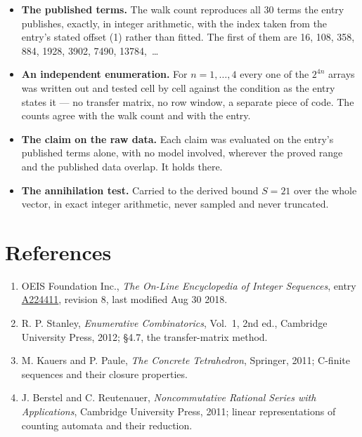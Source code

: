 \documentclass[11pt]{article}
\theoremstyle{definition}
\begin{document}
\begin{itemize}

\item {\bfseries The published terms.} The walk count reproduces all 30 terms the entry publishes, exactly, in integer arithmetic, with the index taken from the entry's stated offset (1) rather than fitted. The first of them are 16, 108, 358, 884, 1928, 3902, 7490, 13784,~\dots

\item {\bfseries An independent enumeration.} For $n = 1,\dots,4$ every one of the $2^{4n}$ arrays was written out and tested cell by cell against the condition as the entry states it --- no transfer matrix, no row window, a separate piece of code. The counts agree with the walk count and with the entry.

\item {\bfseries The claim on the raw data.} Each claim was evaluated on the entry's published terms alone, with no model involved, wherever the proved range and the published data overlap. It holds there.

\item {\bfseries The annihilation test.} Carried to the derived bound $S = 21$ over the whole vector, in exact integer arithmetic, never sampled and never truncated.

\end{itemize}

\section{References}

\begin{enumerate}

\item OEIS Foundation Inc., \emph{The On-Line Encyclopedia of Integer Sequences}, entry \href{https://oeis.org/A224411}{A224411}, revision 8, last modified Aug 30 2018.

\item R. P. Stanley, \emph{Enumerative Combinatorics}, Vol.~1, 2nd ed., Cambridge University Press, 2012; \S4.7, the transfer-matrix method.

\item M. Kauers and P. Paule, \emph{The Concrete Tetrahedron}, Springer, 2011; C-finite sequences and their closure properties.

\item J. Berstel and C. Reutenauer, \emph{Noncommutative Rational Series with Applications}, Cambridge University Press, 2011; linear representations of counting automata and their reduction.

\end{enumerate}
\end{document}
